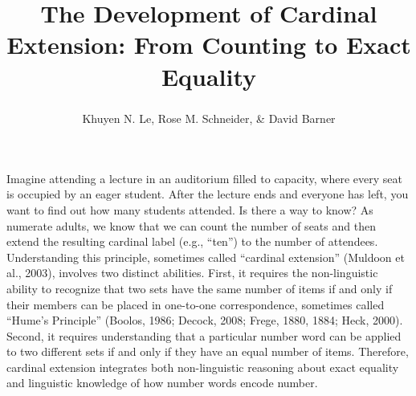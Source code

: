\documentclass[
  man,floatsintext]{apa7}
\title{The Development of Cardinal Extension: From Counting to Exact Equality}
\author{Khuyen N. Le\textsuperscript{}, Rose M. Schneider\textsuperscript{}, \& David Barner\textsuperscript{}}
\date{}
\affiliation{\vspace{0.5cm}\textsuperscript{} {Department of Psychology, University of California, San Diego}}
\begin{document}
\maketitle

Imagine attending a lecture in an auditorium filled to capacity, where every seat is occupied by an eager student. After the lecture ends and everyone has left, you want to find out how many students attended. Is there a way to know? As numerate adults, we know that we can count the number of seats and then extend the resulting cardinal label (e.g., ``ten'') to the number of attendees. Understanding this principle, sometimes called ``cardinal extension'' (Muldoon et al., 2003), involves two distinct abilities. First, it requires the non-linguistic ability to recognize that two sets have the same number of items if and only if their members can be placed in one-to-one correspondence, sometimes called ``Hume's Principle'' (Boolos, 1986; Decock, 2008; Frege, 1880, 1884; Heck, 2000). Second, it requires understanding that a particular number word can be applied to two different sets if and only if they have an equal number of items. Therefore, cardinal extension integrates both non-linguistic reasoning about exact equality and linguistic knowledge of how number words encode number.
\end{document}
